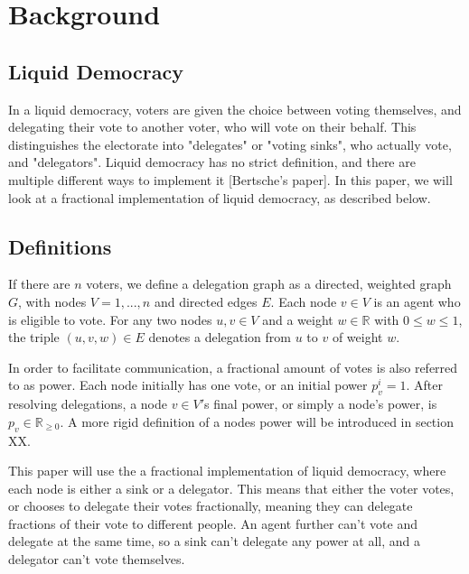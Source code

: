 
\chapter{Background}

\section{Liquid Democracy}

In a liquid democracy, voters are given the choice between voting themselves, and delegating their vote to another voter, who will vote on their behalf. This distinguishes the electorate into "delegates" or "voting sinks", who actually vote, and "delegators". Liquid democracy has no strict definition, and there are multiple different ways to implement it [Bertsche's paper]. In this paper, we will look at a fractional implementation of liquid democracy, as described below.


 \section{Definitions}
 

If there are $n$ voters, we define a delegation graph as a directed, weighted graph $G$, with nodes $V = {1, ..., n}$ and directed edges $E$. Each node $v \in V$ is an agent who is eligible to vote. For any two nodes \(u,v \in V\) and a weight \(w \in \mathbb{R}\) with \(0 \le w \le 1\), the triple \((u,v,w) \in E\) denotes a delegation from \(u\) to \(v\) of weight \(w\). 

In order to facilitate communication, a fractional amount of votes is also referred to as power. Each node initially has one vote, or an initial power $p^i_v = 1$. After resolving delegations, a node $v \in V'$s final power, or simply a node's power, is $p_v \in \mathbb{R}_{\ge0}$. A more rigid definition of a nodes power will be introduced in section XX. 

This paper will use the a fractional implementation of liquid democracy, where each node is either a sink or a delegator. This means that either the voter votes, or chooses to delegate their votes fractionally, meaning they can delegate fractions of their vote to different people. An agent further can't vote and delegate at the same time, so a sink can't delegate any power at all, and a delegator can't vote themselves. 

